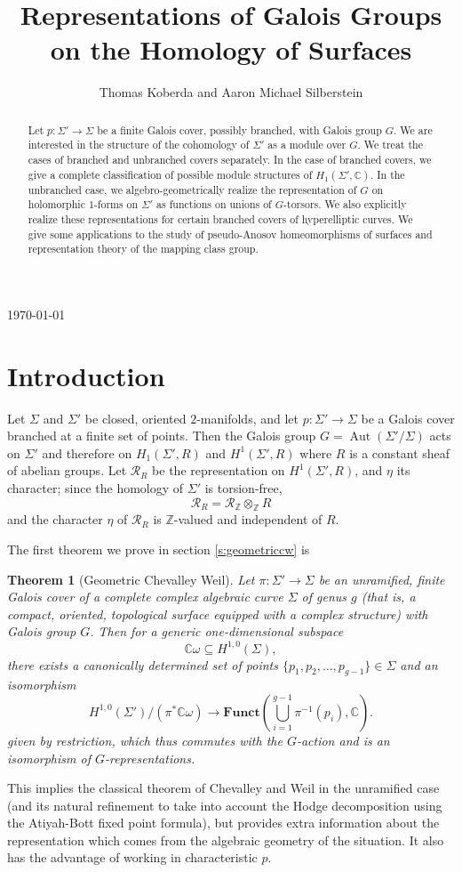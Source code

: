 \documentclass[11pt]{amsart}
\title[Representations of Galois Groups]{Representations of Galois Groups on the Homology of Surfaces}
\author{Thomas Koberda and Aaron Michael Silberstein}
\newtheorem{thm}{Theorem}
\numberwithin{thm}{section}
\begin{document}
\begin{abstract}
Let $p:\Sigma'\to\Sigma$ be a finite Galois cover, possibly branched, with Galois group $G$.  We are interested in the structure of the cohomology of $\Sigma'$ as a module over $G$.  We treat the cases of branched and unbranched covers separately.  In the case of branched covers, we give a complete classification of possible module structures of $H_1(\Sigma',{\mathbb{C}})$.  In the unbranched case, we algebro-geometrically realize the representation of $G$ on holomorphic $1$-forms on $\Sigma'$ as functions on unions of $G$-torsors.  We also explicitly realize these representations for certain branched covers of hyperelliptic curves.  We give some applications to the study of pseudo-Anosov homeomorphisms of surfaces and representation theory of the mapping class group.
\end{abstract}
\maketitle
\begin{center}
\today
\end{center}
\tableofcontents

\section{Introduction}
Let $\Sigma$ and $\Sigma'$ be closed, oriented $2$-manifolds, and let $p: \Sigma'\rightarrow \Sigma$ be a Galois cover branched at a finite set of points.  Then the Galois group $G = {\operatorname{Aut}}(\Sigma'/\Sigma)$ acts on $\Sigma'$ and therefore on $H_1(\Sigma', R)$ and $H^1(\Sigma', R)$ where $R$ is a constant sheaf of abelian groups.  Let $\mathcal{R}_R$ be the representation on $H^1(\Sigma', R)$, and $\eta$ its character; since the homology of $\Sigma'$ is torsion-free, \[\mathcal{R}_R = \mathcal{R}_{\mathbb{Z}} \otimes_{\mathbb{Z}} R\] and the character $\eta$ of $\mathcal{R}_R$ is ${\mathbb{Z}}$-valued and independent of $R$.

The first theorem we prove in section \ref{s:geometriccw} is
\begin{thm}[Geometric Chevalley Weil]
Let $\pi: \Sigma'\rightarrow \Sigma$ be an unramified, finite Galois cover of a complete complex algebraic curve $\Sigma$ of genus $g$ (that is, a compact, oriented, topological surface equipped with a complex structure) with Galois group $G$.  Then for a generic one-dimensional subspace
\[\mathbb{C}\omega \subseteq H^{1,0}(\Sigma),
\]
there exists a canonically determined set of points $\{p_1, p_2, \dots, p_{g-1}\} \in \Sigma$ and an isomorphism
\[
H^{1,0}(\Sigma')/(\pi^*\mathbb{C}\omega)\rightarrow {\mathbf{Funct}}(\bigcup_{i=1}^{g-1}\pi^{-1}(p_i),\mathbb{C}).
\]
given by restriction, which thus commutes with the $G$-action and is an isomorphism of $G$-representations.
\end{thm}
This implies the classical theorem of Chevalley and Weil \cite{CW} in the unramified case (and its natural refinement to take into account the Hodge decomposition using the Atiyah-Bott fixed point formula), but provides extra information about the representation which comes from the algebraic geometry of the situation.  It also has the advantage of working in characteristic $p$.
\end{document}
